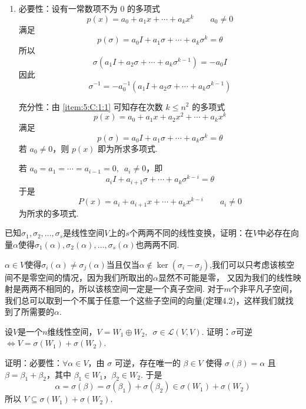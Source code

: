 \begin{exercise}
\begin{exgroup}
\begin{answer}
\begin{enumerate}
                \item 必要性：设有一常数项不为 0 的多项式
                      \[ p(x) = a_0 + a_1 x + \cdots + a_k x^k \qquad a_0 \neq 0 \]
                      满足
                      \[ p(\sigma) = a_0 I + a_1 \sigma + \cdots + a_k \sigma^k = \theta \]
                      所以
                      \[ \sigma(a_1 I + a_2 \sigma + \cdots + a_k \sigma^{k - 1}) = -a_0 I \]
                      因此
                      \[ \sigma^{-1} = -a_0^{-1} (a_1 I + a_2 \sigma + \cdots + a_k \sigma^{k - 1}) \]

                      充分性：由 \ref*{item:5:C:1:1} 可知存在次数 $ k \leqslant n^2 $ 的多项式
                      \[ p(x) = a_0 + a_1 x + a_2 x^2 + \cdots + a_k x^k \]
                      满足
                      \[ p(\sigma) = a_0 I + a_1 \sigma + \cdots + a_k \sigma^k = \theta \]
                      若 $ a_0 \neq 0 $，则 $ p(x) $ 即为所求多项式.

                      若 $ a_0 = a_1 = \cdots = a_{i - 1} = 0,\enspace a_i \neq 0 $，即
                      \[ a_i I + a_{i + 1} \sigma + \cdots + a_k \sigma^{k - i} = \theta \]
                      于是
                      \[ P(x) = a_i + a_{i + 1} x + \cdots + a_k x^{k - i} \qquad a_i \neq 0 \]
                      为所求的多项式.
            \end{enumerate}
        \end{answer}
        \item 已知$\sigma_1,\sigma_2,\ldots,\sigma_s$是线性空间$V$上的$s$个两两不同的线性变换，证明：在$V$中必存在向量$\alpha$使得$\sigma_1(\alpha),\sigma_2(\alpha),\ldots,\sigma_s(\alpha)$也两两不同.
        \begin{answer}
            $\alpha \in V$使得$\sigma_i(\alpha) \neq \sigma_j(\alpha)$当且仅当$\alpha \notin \ker(\sigma_i - \sigma_j)$,我们可以只考虑该核空间不是零空间的情况，因为我们所取出的$\alpha$显然不可能是零，
            又因为我们的线性映射是两两不相同的，所以该核空间一定是一个真子空间. 对于$m$个非平凡子空间，我们总可以取到一个不属于任意一个这些子空间的向量(定理4.2)，这样我们就找到了所需要的$\alpha$.
        \end{answer}
        \item 设$V$是一个$n$维线性空间，$V=W_1\oplus W_2,\enspace\sigma\in \mathcal{L}(V,V)$. 证明：$\sigma$可逆$\iff V=\sigma(W_1)+\sigma(W_2)$.
        \begin{answer}
            证明：必要性：$ \forall \alpha \in V $，由 $ \sigma $ 可逆，存在唯一的 $ \beta \in V $ 使得 $ \sigma(\beta) = \alpha $ 且 $ \beta = \beta_1 + \beta_2 $，其中 $ \beta_1 \in W_1 $，$ \beta_2 \in W_2 $. 于是
          \[ \alpha = \sigma(\beta) = \sigma(\beta_1) + \sigma(\beta_2) \in \sigma(W_1) + \sigma(W_2) \]
          所以 $ V \subseteq \sigma(W_1) + \sigma(W_2) $.


\end{answer}
\end{exgroup}
\end{exercise}
